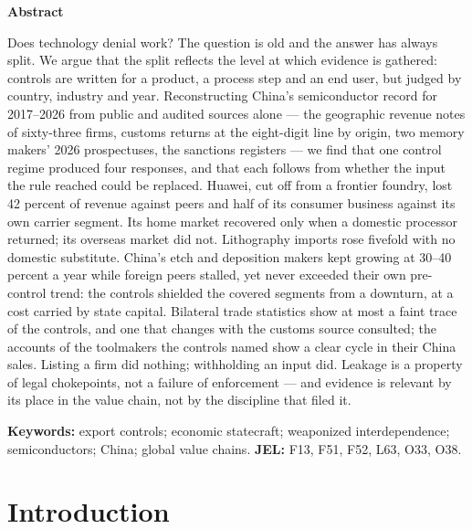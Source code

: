 \documentclass[12pt]{article}
\begin{document}
\begin{titlepage}
\begin{minipage}{0.92\textwidth}\begin{center}\textbf{Abstract}\end{center}\small{}Does technology denial work? The question is old and the answer has always split. We argue that the split reflects the level at which evidence is gathered: controls are written for a product, a process step and an end user, but judged by country, industry and year. Reconstructing China's semiconductor record for 2017–2026 from public and audited sources alone — the geographic revenue notes of sixty-three firms, customs returns at the eight-digit line by origin, two memory makers' 2026 prospectuses, the sanctions registers — we find that one control regime produced four responses, and that each follows from whether the input the rule reached could be replaced. Huawei, cut off from a frontier foundry, lost 42 percent of revenue against peers and half of its consumer business against its own carrier segment. Its home market recovered only when a domestic processor returned; its overseas market did not. Lithography imports rose fivefold with no domestic substitute. China's etch and deposition makers kept growing at 30–40 percent a year while foreign peers stalled, yet never exceeded their own pre-control trend: the controls shielded the covered segments from a downturn, at a cost carried by state capital. Bilateral trade statistics show at most a faint trace of the controls, and one that changes with the customs source consulted; the accounts of the toolmakers the controls named show a clear cycle in their China sales. Listing a firm did nothing; withholding an input did. Leakage is a property of legal chokepoints, not a failure of enforcement — and evidence is relevant by its place in the value chain, not by the discipline that filed it.\vspace{0.35cm}\par\noindent\footnotesize\textbf{Keywords:} export controls; economic statecraft; weaponized interdependence; semiconductors; China; global value chains. \textbf{JEL:} F13, F51, F52, L63, O33, O38.\end{minipage}\vfill\end{titlepage}
\section{Introduction}
\end{document}
